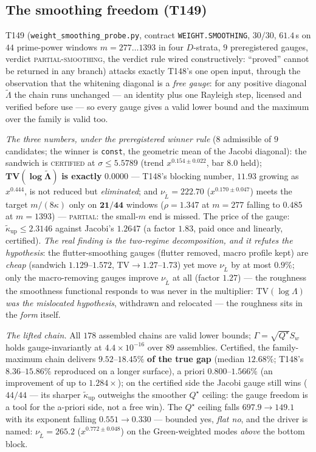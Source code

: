 \documentclass[11pt,a4paper]{article}
\begin{document}
\subsection{The smoothing freedom (T149)}
T149 (\texttt{weight\_smoothing\_probe.py}, contract \texttt{WEIGHT.SMOOTHING}, $30/30$,
$61.4$\,s on $44$ prime-power windows $m=277\ldots1393$ in four $D$-strata, $9$ preregistered
gauges, verdict \textsc{partial-smoothing}, the verdict rule wired constructively: ``proved''
cannot be returned in any branch) attacks exactly T148's one open input, through the
observation that the whitening diagonal is a \emph{free gauge}: for any positive diagonal
$\tilde\Lambda$ the chain runs unchanged --- an identity plus one Rayleigh step, licensed and
verified before use --- so every gauge gives a valid lower bound and the maximum over the
family is valid too.

\emph{The three numbers, under the preregistered winner rule} ($8$ admissible of $9$
candidates; the winner is \texttt{const}, the geometric mean of the Jacobi diagonal): the
sandwich is \textsc{certified} at $\sigma\le5.5789$ (trend $x^{0.154\pm0.022}$, bar $8.0$
held); $\mathbf{TV(\log\tilde\Lambda)}$ \textbf{is exactly} $\mathbf{0.0000}$ --- T148's
blocking number, $11.93$ growing as $x^{0.444}$, is not reduced but \emph{eliminated}; and
$\nu_{\tilde L}=222.70$ ($x^{0.170\pm0.047}$) meets the target $m/(8\kappa)$ only on
$\mathbf{21/44}$ windows ($\rho=1.347$ at $m=277$ falling to $0.485$ at $m=1393$) ---
\textsc{partial}: the small-$m$ end is missed. The price of the gauge:
$\tilde\kappa_{\mathrm{up}}\le2.3146$ against Jacobi's $1.2647$ (a factor $1.83$, paid once
and linearly, certified). \emph{The real finding is the two-regime decomposition, and it
refutes the hypothesis}: the flutter-smoothing gauges (flutter removed, macro profile kept)
are \emph{cheap} (sandwich $1.129$--$1.572$, $\mathrm{TV}\to1.27$--$1.73$) yet move
$\nu_{\tilde L}$ by at most $\mathbf{0.9\%}$; only the macro-removing gauges improve
$\nu_{\tilde L}$ at all (factor $1.27$) --- the roughness the smoothness functional responds
to was never in the multiplier: $\mathrm{TV}(\log\Lambda)$ \emph{was the mislocated
hypothesis}, withdrawn and relocated --- the roughness sits in the \emph{form} itself.

\emph{The lifted chain.} All $178$ assembled chains are valid lower bounds;
$\Gamma=\sqrt{Q^\star}S_w$ holds gauge-invariantly at $4.4\times10^{-16}$ over $89$
assemblies. Certified, the family-maximum chain delivers $\mathbf{9.52}$--$\mathbf{18.45\%}$
\textbf{of the true gap} (median $12.68\%$; T148's $8.36$--$15.86\%$ reproduced on a longer
surface), a priori $0.800$--$1.566\%$ (an improvement of up to $1.284\times$); on the
certified side the Jacobi gauge still wins ($44/44$ --- its sharper
$\tilde\kappa_{\mathrm{up}}$ outweighs the smoother $Q^\star$ ceiling: the gauge freedom is a
tool for the a-priori side, not a free win). The $Q^\star$ ceiling falls $697.9\to149.1$ with
its exponent falling $0.551\to0.330$ --- bounded yes, \emph{flat no}, and the driver is named:
$\nu_{\tilde L}=265.2$ ($x^{0.772\pm0.048}$) on the Green-weighted modes \emph{above} the
bottom block.
\end{document}
